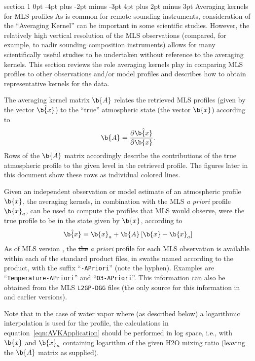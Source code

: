 \documentclass[11pt,draft]{report}
\makeatletter
\renewcommand{\section}{\@startsection%
  {section}%
  {1}%
  {0pt}%
  {-4pt plus -2pt minus -3pt}%
  {4pt plus 2pt minus 3pt}%
  {\Large\sffamily\fontseries{sb}\selectfont\flushleft\color{SectionColor}\figureversion{tabular}}}%
\providecommand{\DIFdeltex}[1]{{\protect\color{red}\sout{#1}}}                      %
\providecommand{\DIFdelbegin}{} %
\providecommand{\DIFdelend}{} %
\providecommand{\DIFdel}[1]{\texorpdfstring{\DIFdeltex{#1}}{}} %
\makeatother
\begin{document}
\section{Averaging kernels for MLS \thisv profiles}
\label{sec:AveragingKernels}
As is common for remote sounding instruments, consideration of the
``Averaging Kernel'' \citep[e.g.,][]{Rodgers00} can be important in some
scientific studies.  However, the relatively high vertical resolution of
the MLS observations (compared, for example, to nadir sounding
composition instruments) allows for many scientifically useful studies
to be undertaken without reference to the averaging kernels.  This
section reviews the role averaging kernels play in comparing MLS
profiles to other observations and/or model profiles and describes how
to obtain representative kernels for the \thisv data.

The averaging kernel matrix $\b{A}$ relates the retrieved MLS profiles
(given by the vector $\hat{\b{x}}$) to the ``true'' atmospheric state (the
vector $\b{x}$) according to
\begin{equation}
  \b{A} = \frac{\partial\hat{\b{x}}}{\partial\b{x}}.
\end{equation}
Rows of the $\b{A}$ matrix accordingly describe the contributions of the
true atmospheric profile to the given level in the retrieved profile.
The figures later in this document show these rows as individual colored
lines.

Given an independent observation or model estimate of an atmospheric
profile $\b{x}$, the averaging kernels, in combination with the MLS
\emph{a priori} profile $\b{x}_a$, can be used to compute the profiles
that MLS would observe, were the true profile to be in the state given
by $\b{x}$, according to
\begin{equation}
  \hat{\b{x}} = \b{x}_a + \b{A}\left[\b{x}-\b{x}_a\right]
\label{eqn:AVKApplication}
\end{equation}
As of MLS version \thisv, the \DIFdelbegin \DIFdel{the }\DIFdelend \emph{a priori} profile for each MLS
observation is available within each of the standard product files, in
swaths named according to the product, with the suffix
``\texttt{-APriori}'' (note the hyphen).  Examples are
``\texttt{Temperature-APriori}'' and ``\texttt{O3-APriori}''.  This
information can also be obtained from the MLS \texttt{L2GP-DGG} files
(the only source for this information in \prevv and earlier versions).

Note that in the case of water vapor where (as described below) a
logarithmic interpolation is used for the profile, the calculations in
equation~\ref{eqn:AVKApplication} should be performed in log space,
i.e., with $\b{x}$ and $\b{x}_a$ containing logarithm of the given
H\cs2O mixing ratio (leaving the $\b{A}$ matrix as supplied).
\end{document}
